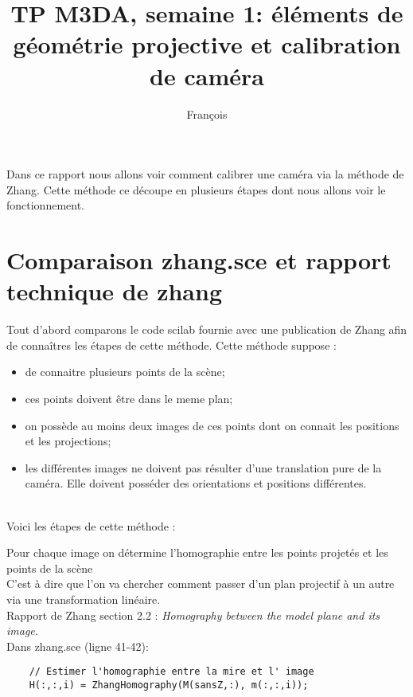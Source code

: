\documentclass[a4paper,10pt]{article}
\title{TP M3DA, semaine 1: \'el\'ements de g\'eom\'etrie projective et calibration de cam\'era}
\author{Fran\c{c}ois \bsc{Lepan}}
\begin{document}
\maketitle

Dans ce rapport nous allons voir comment calibrer une cam\'era via la m\'ethode de Zhang. Cette m\'ethode ce d\'ecoupe en plusieurs \'etapes dont nous allons voir le fonctionnement.

\section*{Comparaison zhang.sce et rapport technique de zhang}

Tout d'abord comparons le code scilab fournie avec une publication de Zhang afin de conna\^itres les \'etapes de cette m\'ethode. Cette m\'ethode suppose : \\

\begin{itemize}
\item de connaitre plusieurs points de la sc\`ene;
\item ces points doivent \^etre dans le meme plan;
\item on poss\`ede au moins deux images de ces points dont on connait les positions et les projections;
\item les diff\'erentes images ne doivent pas r\'esulter d'une translation pure de la cam\'era. Elle doivent poss\'eder des orientations et positions diff\'erentes.
\end{itemize}
~\\

Voici les \'etapes de cette m\'ethode :

\begin{paragraph}{Pour chaque image on d\'etermine l'homographie entre les points projet\'es et les points de la sc\`ene}~\\

C'est \`a dire que l'on va chercher comment passer d'un plan projectif \`a un autre via une transformation lin\'eaire. \\

Rapport de Zhang section 2.2 : \emph{Homography between the model plane and its image.} ~\\

Dans zhang.sce (ligne 41-42):

\begin{Verbatim}
	// Estimer l'homographie entre la mire et l' image
	H(:,:,i) = ZhangHomography(M(sansZ,:), m(:,:,i));
\end{Verbatim}
\end{paragraph}
\end{document}
